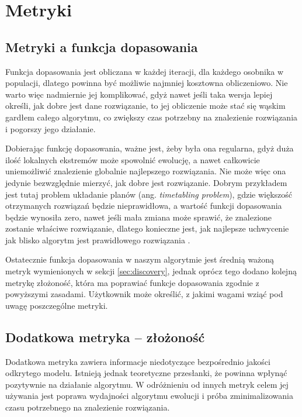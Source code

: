 \section{Metryki}
\label{sec:metryki}

\subsection{Metryki a funkcja dopasowania}

Funkcja dopasowania jest obliczana w każdej iteracji, dla każdego osobnika w populacji, dlatego powinna być możliwie najmniej kosztowna obliczeniowo. Nie warto więc nadmiernie jej komplikować, gdyż nawet jeśli taka wersja lepiej określi, jak dobre jest dane rozwiązanie, to jej obliczenie może stać się wąskim gardłem całego algorytmu, co zwiększy czas potrzebny na znalezienie rozwiązania i pogorszy jego działanie. 

Dobierając funkcję dopasowania, ważne jest, żeby była ona regularna, gdyż duża ilość lokalnych ekstremów może spowolnić ewolucję, a nawet całkowicie uniemożliwić znalezienie globalnie najlepszego rozwiązania.
Nie może więc ona jedynie bezwzględnie mierzyć, jak dobre jest rozwiązanie. Dobrym przykładem jest tutaj problem układanie planów (ang. \textit{timetabling problem}), gdzie większość otrzymanych rozwiązań będzie nieprawidłowa, a wartość funkcji dopasowania będzie wynosiła zero, nawet jeśli mała zmiana może sprawić, że znalezione zostanie właściwe rozwiązanie, dlatego konieczne jest, jak najlepsze uchwycenie jak blisko algorytm jest prawidłowego rozwiązania \cite{icga85:cramer, beasley:1993:ogapf}.

Ostatecznie funkcja dopasowania w naszym algorytmie jest średnią ważoną metryk wymienionych w sekcji \ref{sec:discovery}, jednak oprócz tego dodano kolejną metrykę złożoność, która ma poprawiać funkcje dopasowania zgodnie z powyższymi zasadami. Użytkownik może określić, z jakimi wagami wziąć pod uwagę poszczególne metryki.

\subsection{Dodatkowa metryka -- złożoność}
\label{sec:additional-metric-complexity}
Dodatkowa metryka zawiera informacje niedotyczące bezpośrednio jakości odkrytego modelu. Istnieją jednak  teoretyczne przesłanki, że powinna wpłynąć pozytywnie na działanie algorytmu. W odróżnieniu od innych metryk celem jej używania jest poprawa wydajności algorytmu ewolucji i próba zminimalizowania czasu potrzebnego na znalezienie rozwiązania.
 

